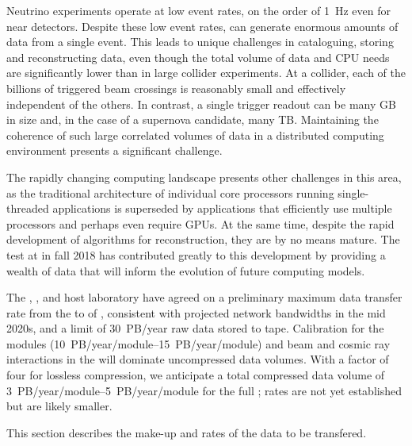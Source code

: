 Neutrino experiments operate at low event rates, on the order of \SI{1}{Hz} even for near detectors. 
Despite these low event rates, %
 can generate enormous amounts of data from a single event. %
This leads to unique challenges in cataloguing, storing and reconstructing data, even though the total volume of data and CPU needs are significantly lower than in large collider experiments.  At a collider, each of the billions of triggered beam crossings is reasonably small and  effectively independent of the others. In contrast, a single  trigger readout can be many GB in size and, in the case of a supernova candidate, many TB. Maintaining the coherence of such large correlated %
volumes of data in a distributed computing environment presents a significant challenge. %

The rapidly changing computing landscape presents other challenges in this area, as 
the traditional  architecture of individual core processors running single-threaded applications %
is superseded by applications that efficiently use multiple processors and perhaps even require GPUs. At the same time, despite the rapid development of algorithms for  reconstruction, they are by no means mature. %
The  test at  in fall 2018 has contributed greatly to this development by providing a wealth of data that will inform the evolution of future  computing models.  %

The ,   ,  and host laboratory %
have agreed on a preliminary maximum data transfer rate from the  to  of \surffnalbw{}, consistent with projected network bandwidths in the mid 2020s, and a limit of \SI{30}{PB/year} raw data stored to tape. 
Calibration for the  modules (\SIrange{10}{15}{PB/year/module}) and beam and cosmic ray interactions in the  will dominate uncompressed data volumes.  With a  factor of four for lossless compression, we anticipate a total compressed data volume of \SIrange{3}{5}{PB/year/module} for the full ;  rates are not yet established but are likely smaller.   

This section describes the make-up and rates of the data to be transfered. 

